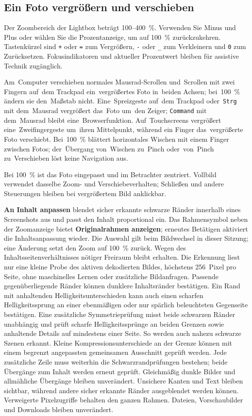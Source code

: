 \documentclass[11pt,a4paper]{article}
\newcommand{\ui}[1]{\textbf{#1}}
\newcommand{\codeword}[1]{\nolinkurl{#1}}
\begin{document}
\subsection{Ein Foto vergrößern und verschieben}

Der Zoombereich der Lightbox beträgt 100--400~\%. Verwenden Sie Minus und Plus
oder wählen Sie die Prozentanzeige, um auf 100~\% zurückzukehren. Tastenkürzel
sind \codeword{+} oder \codeword{=} zum Vergrößern, \codeword{-} oder
\codeword{\_} zum Verkleinern und \codeword{0} zum Zurücksetzen.
Fokusindikatoren und aktueller Prozentwert bleiben für assistive Technik
zugänglich.

Am~Computer verschieben normales Mausrad-Scrollen und~Scrollen mit zwei Fingern
auf~dem Trackpad ein~vergrößertes Foto in~beiden Achsen; bei~100~\% ändern sie
den~Maßstab nicht. Eine~Spreizgeste auf~dem Trackpad oder~\codeword{Strg} mit
dem~Mausrad vergrößert das~Foto um~den Zeiger; \codeword{Command} mit
dem~Mausrad bleibt eine~Browserfunktion. Auf~Touchscreens vergrößert
eine~Zweifingergeste um~ihren Mittelpunkt, während ein Finger das~vergrößerte
Foto verschiebt. Bei~100~\% blättert horizontales Wischen mit einem Finger
zwischen Fotos; der~Übergang von~Wischen zu~Pinch oder~von~Pinch zu~Verschieben
löst keine Navigation aus.

Bei 100~\% ist das Foto eingepasst und im Betrachter zentriert. Vollbild
verwendet dasselbe Zoom- und Verschiebeverhalten; Schließen und andere
Steuerungen bleiben bei vergrößertem Bild anklickbar.

\ui{An Inhalt anpassen} blendet sicher erkannte schwarze Ränder innerhalb
eines Screenshots aus und passt den Inhalt proportional ein. Das Rahmensymbol
neben der Zoomanzeige bietet \ui{Originalrahmen anzeigen}; erneutes Betätigen
aktiviert die Inhaltsanpassung wieder. Die Auswahl gilt beim Bildwechsel in
dieser Sitzung; eine Änderung setzt den Zoom auf 100~\% zurück. Wegen des
Inhaltsseitenverhältnisses nötiger Freiraum bleibt erhalten.
Die Erkennung liest nur eine kleine Probe des aktiven dekodierten Bildes,
höchstens 256~Pixel pro Seite, ohne maschinelles Lernen oder zusätzliche
Bildanfragen. Passende gegenüberliegende Ränder können dunklere Inhaltsränder
bestätigen. Ein Rand mit anhaltenden Helligkeitsunterschieden kann auch einen
scharfen Helligkeitssprung an einer ebenmäßigen oder nur spärlich beleuchteten
Gegenseite bestätigen. Eine zusätzliche Symmetrieprüfung misst beide schwarzen
Ränder unabhängig und prüft scharfe Helligkeitssprünge an beiden Grenzen sowie
anhaltende Details auf mindestens einer Seite. So werden auch nahezu schwarze
Szenen erkannt. Kleine Kompressionsunterschiede an der Grenze können mit einem
begrenzt angepassten gemeinsamen Ausschnitt geprüft werden. Jede zusätzliche
Zeile muss weiterhin die Schwarzrandprüfungen bestehen; beide Übergänge zum
Inhalt werden erneut geprüft. Gleichmäßig dunkle Bilder und allmähliche
Übergänge
bleiben unverändert. Unsichere Kanten und Text
bleiben sichtbar, während andere sicher erkannte Ränder ausgeblendet werden
können. Verweigerte
Pixelzugriffe behalten den ganzen Rahmen. Dateien, Vorschaubilder und
Downloads bleiben unverändert.
\end{document}
